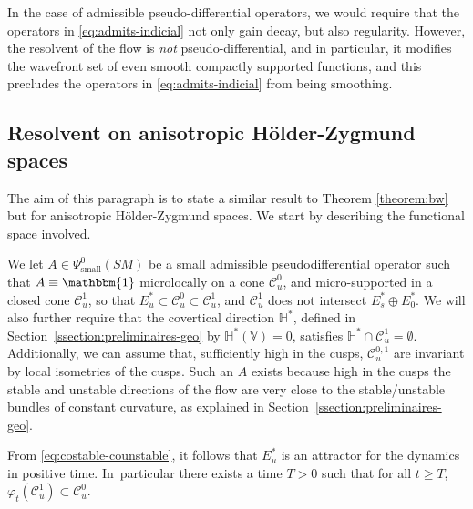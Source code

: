 \documentclass[JEP,XML,SOM,Unicode,NoFloatCountersInSection]{cedram}
\newcommand{\V}{\mathbb{V}}
\newcommand{\HH}{\mathbb{H}}
\newcommand{\mc}{\mathcal}
\theoremstyle{plain}
\theoremstyle{definition}
\begin{document}
In the case of admissible pseudo-differential operators, we would require that the operators in \eqref{eq:admits-indicial} not only gain decay, but also regularity. However, the resolvent of the flow is \emph{not} pseudo-differential, and in particular, it modifies the wavefront set of even smooth compactly supported functions, and this precludes the operators in \eqref{eq:admits-indicial} from being smoothing.

\subsection{Resolvent on anisotropic Hölder-Zygmund spaces}
\label{section:holder}

The aim of this paragraph is to state a similar result to Theorem \ref{theorem:bw} but for anisotropic Hölder-Zygmund spaces. We start by describing the functional space involved.

We let $A \in \Psi^0_{\mathrm{small}}(SM)$ be a small admissible pseudodifferential operator such that $A \equiv \mathbbm{1}$ microlocally on a cone $\mc{C}_u^0$, and micro-supported in a closed cone $\mathcal{C}_u^1$, so that $E^\ast_u\subset \mc{C}_u^0\subset \mc{C}_u^1$, and $\mc{C}_u^1$ does not intersect $E^\ast_s \oplus E^\ast_0$. We will also further require that the covertical direction $\HH^*$, defined in Section~\ref{ssection:preliminaires-geo} by $\HH^*(\V)=0$, satisfies $\HH^* \cap \mc{C}_u^1 = \emptyset$. Additionally, we can assume that, sufficiently high in the cusps, $\mc{C}_u^{0,1}$ are invariant by local isometries of the cusps. Such an $A$ exists because high in the cusps the stable and unstable directions of the flow are very close to the stable/unstable bundles of constant curvature, as explained in Section~\ref{ssection:preliminaires-geo}.

{\color{black}From \eqref{eq:costable-counstable}, it follows that $E^\ast_u$ is an attractor for the dynamics in positive time. In~particular there exists a time $T>0$ such that for all $t\geq T$, $\varphi_t(\mc{C}_u^1) \subset \mc{C}_u^0$.}
\end{document}
